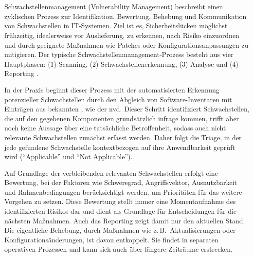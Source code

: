 

\section{}\label{sec:grundlagen-vms}

Schwachstellenmanagement (Vulnerability Management) beschreibt einen zyklischen Prozess zur Identifikation, Bewertung, Behebung und Kommunikation von Schwachstellen in IT-Systemen.
Ziel ist es, Sicherheitslücken möglichst frühzeitig, idealerweise vor Auslieferung, zu erkennen, nach Risiko einzuordnen und durch geeignete Maßnahmen wie Patches oder Konfigurationsanpassungen zu mitigieren.
Der typische Schwachstellenmanagement-Prozess besteht aus vier Hauptphasen: (1) Scanning, (2) Schwachstellenerkennung, (3) Analyse und (4) Reporting \autocite{foreman2019vulnerabilityManagement}.

In der Praxis beginnt dieser Prozess mit der automatisierten Erkennung potenzieller Schwachstellen durch den Abgleich von Software-Inventaren mit Einträgen aus bekannten , wie der \acrshort{nvd}.
Dieser Schritt identifiziert Schwachstellen, die auf den gegebenen Komponenten grundsätzlich infrage kommen, trifft aber noch keine Aussage über eine tatsächliche Betroffenheit, sodass auch nicht relevante Schwachstellen zunächst erfasst werden.
Daher folgt die Triage, in der jede gefundene Schwachstelle kontextbezogen auf ihre Anwendbarkeit geprüft wird (\enquote{Applicable} und \enquote{Not Applicable}).

Auf Grundlage der verbleibenden relevanten Schwachstellen erfolgt eine Bewertung, bei der Faktoren wie Schweregrad, Angriffsvektor, Ausnutzbarkeit und Rahmenbedingungen berücksichtigt werden, um Prioritäten für das weitere Vorgehen zu setzen.
Diese Bewertung stellt immer eine Momentaufnahme des identifizierten Risikos dar und dient als Grundlage für Entscheidungen für die nächsten Maßnahmen.
Auch das Reporting zeigt damit nur den aktuellen Stand.
Die eigentliche Behebung, durch Maßnahmen wie z.\,B.\ Aktualisierungen oder Konfigurationsänderungen, ist davon entkoppelt.
Sie findet in separaten operativen Prozessen und kann sich auch über längere Zeiträume erstrecken.

